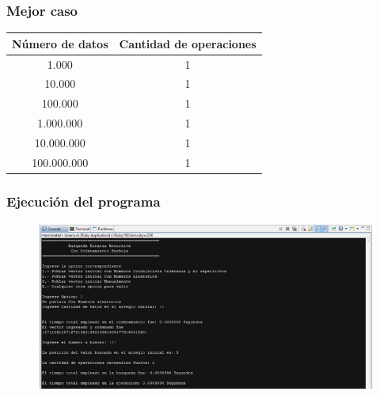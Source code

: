 \subsubsection{Mejor caso}

\begin{center}
\begin{tabular}{|c|c|}
\hline
\cellcolor[gray]{0.85} \textbf{Número de datos} & 	\cellcolor[gray]{0.85} \textbf{Cantidad de operaciones}\\

\hline
1.000		&	1\\
\hline
10.000	&	1  \\
\hline
100.000	&	1  \\
\hline
1.000.000	&	1  \\
\hline
10.000.000	&	1  \\
\hline
100.000.000	&	1  \\
\hline
\end{tabular}
\end{center}

\subsubsection{Ejecución del programa}

\begin{figure}[h]
\centering
    \includegraphics[width=\textwidth]{imagen_4.png}
\end{figure}


